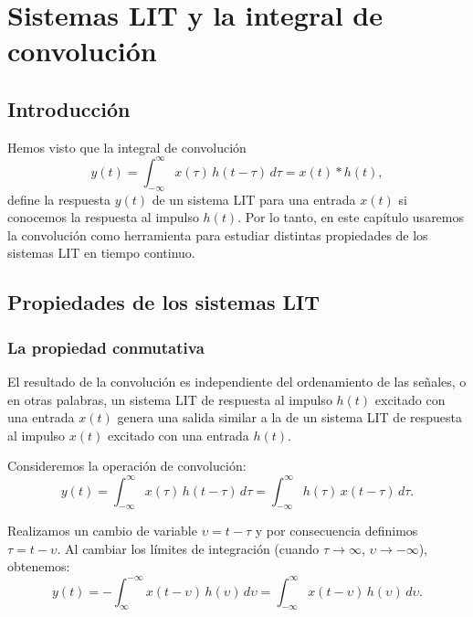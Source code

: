 \chapter{Sistemas LIT y la integral de convolución}


\section{Introducción}

Hemos visto que la integral de convolución 
\begin{equation}
	y(t) = \int_{-\infty }^{\infty } x(\tau) \, h(t-\tau) \, d\tau = x(t) * h(t) ,
\end{equation}
define la respuesta $y(t)$ de un sistema LIT para una entrada $x(t)$ si conocemos la respuesta al impulso $h(t)$. Por lo tanto, en este capítulo usaremos la convolución como herramienta para estudiar distintas propiedades de los sistemas LIT en tiempo continuo.

\section{Propiedades de los sistemas LIT}

\subsection{La propiedad conmutativa}

El resultado de la convolución es independiente del ordenamiento de las señales, o en otras palabras, un sistema LIT de respuesta al impulso $h(t)$ excitado con una entrada $x(t)$ genera una salida similar a la de un sistema LIT de respuesta al impulso $x(t)$ excitado con una entrada $h(t)$.

Consideremos la operación de convolución:
\begin{equation}
	y(t) = \int_{-\infty }^{\infty } x(\tau) \, h(t-\tau) \, d\tau = \int_{-\infty }^{\infty } h(\tau) \, x(t-\tau) \, d\tau .
\end{equation}

Realizamos un cambio de variable $\upsilon = t - \tau$ y por consecuencia definimos $\tau = t - \upsilon$. Al cambiar los límites de integración (cuando $\tau \to \infty$, $\upsilon \to -\infty$), obtenemos:
\begin{equation}
	y(t) = -\int_{\infty }^{-\infty } x(t-\upsilon) \, h(\upsilon) \, d\upsilon = \int_{-\infty }^{\infty } x(t-\upsilon) \, h(\upsilon) \, d\upsilon .
\end{equation}

